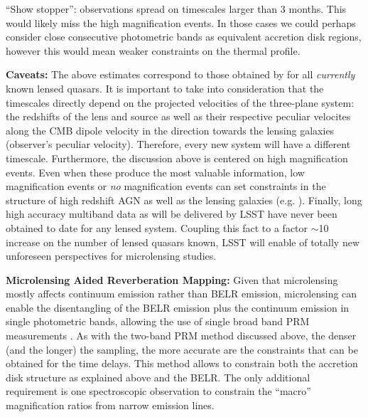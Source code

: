 ``Show stopper'': observations spread on timescales larger than 3 months.
This would likely miss the high magnification events. In those cases
we could perhaps consider close consecutive photometric bands as
equivalent accretion disk regions, however this would mean weaker
constraints on the thermal profile.

{\bf Caveats:} The above estimates correspond to those obtained by \citet{MosqueraandKochanek2011} for all \emph{currently} known lensed quasars. It is important to take into consideration that the timescales directly depend on the projected velocities of the three-plane system: the redshifts of the lens and source as well as their respective peculiar velocites along the CMB dipole velocity in the direction towards the lensing galaxies (observer's peculiar velocity). Therefore, every new system will have a different timescale. Furthermore, the discussion above is centered on high magnification events. Even when these produce the most valuable information, low magnification events or \emph{no} magnification events can set constraints in the structure of high redshift AGN as well as the lensing galaxies (e.g. \citealt{gilmerino2005}). Finally, long high accuracy multiband data as will be delivered by LSST have never been obtained to date for any lensed system. Coupling this fact to a factor $\sim$10 increase on the number of lensed quasars known, LSST will enable of totally new unforeseen perspectives for microlensing studies.

%

{\bf Microlensing Aided Reverberation Mapping:} Given that
microlensing mostly affects continuum emission rather than BELR emission, microlensing can enable the disentangling of the BELR emission plus the
continuum emission in single photometric bands, allowing the use of
single broad band PRM measurements \citep{SluseandTewes2014}. As with
the two-band PRM method discussed above, the denser (and the longer)
the sampling, the more accurate are the constraints that can be
obtained for the time delays. This method allows to constrain both the accretion disk structure as explained above and the BELR. The only additional requirement is one spectroscopic observation to constrain the ``macro'' magnification ratios from narrow emission lines.


